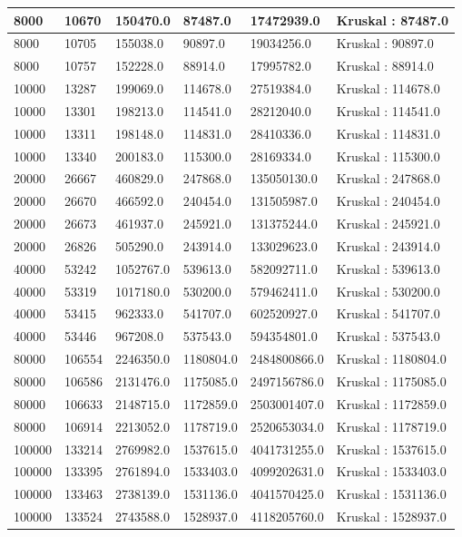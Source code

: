 \begin{longtable}[H]{|p{1.5cm}|p{1.5cm}|p{2cm}|p{2cm}|p{3cm}|p{3cm}|}
    8000 & 10670 & 150470.0 & 87487.0 & 17472939.0 & Kruskal : 87487.0 \\ \hline
    8000 & 10705 & 155038.0 & 90897.0 & 19034256.0 & Kruskal : 90897.0 \\ \hline
    8000 & 10757 & 152228.0 & 88914.0 & 17995782.0 & Kruskal : 88914.0 \\ \hline
    10000 & 13287 & 199069.0 & 114678.0 & 27519384.0 & Kruskal : 114678.0 \\ \hline 
    10000 & 13301 & 198213.0 & 114541.0 & 28212040.0 & Kruskal : 114541.0 \\ \hline 
    10000 & 13311 & 198148.0 & 114831.0 & 28410336.0 & Kruskal : 114831.0 \\ \hline 
    10000 & 13340 & 200183.0 & 115300.0 & 28169334.0 & Kruskal : 115300.0 \\ \hline 
    20000 & 26667 & 460829.0 & 247868.0 & 135050130.0 & Kruskal : 247868.0 \\ \hline
    20000 & 26670 & 466592.0 & 240454.0 & 131505987.0 & Kruskal : 240454.0 \\ \hline
    20000 & 26673 & 461937.0 & 245921.0 & 131375244.0 & Kruskal : 245921.0 \\ \hline
    20000 & 26826 & 505290.0 & 243914.0 & 133029623.0 & Kruskal : 243914.0 \\ \hline
    40000 & 53242 & 1052767.0 & 539613.0 & 582092711.0 & Kruskal : 539613.0 \\ \hline 
    40000 & 53319 & 1017180.0 & 530200.0 & 579462411.0 & Kruskal : 530200.0 \\ \hline 
    40000 & 53415 & 962333.0 & 541707.0 & 602520927.0 & Kruskal : 541707.0 \\ \hline 
    40000 & 53446 & 967208.0 & 537543.0 & 594354801.0 & Kruskal : 537543.0 \\ \hline 
    80000 & 106554 & 2246350.0 & 1180804.0 & 2484800866.0 & Kruskal : 1180804.0 \\ \hline
    80000 & 106586 & 2131476.0 & 1175085.0 & 2497156786.0 & Kruskal : 1175085.0 \\ \hline
    80000 & 106633 & 2148715.0 & 1172859.0 & 2503001407.0 & Kruskal : 1172859.0 \\ \hline
    80000 & 106914 & 2213052.0 & 1178719.0 & 2520653034.0 & Kruskal : 1178719.0 \\ \hline
    100000 & 133214 & 2769982.0 & 1537615.0 & 4041731255.0 & Kruskal : 1537615.0 \\ \hline 
    100000 & 133395 & 2761894.0 & 1533403.0 & 4099202631.0 & Kruskal : 1533403.0 \\ \hline 
    100000 & 133463 & 2738139.0 & 1531136.0 & 4041570425.0 & Kruskal : 1531136.0 \\ \hline 
    100000 & 133524 & 2743588.0 & 1528937.0 & 4118205760.0 & Kruskal : 1528937.0 \\ \hline 
\end{longtable}









